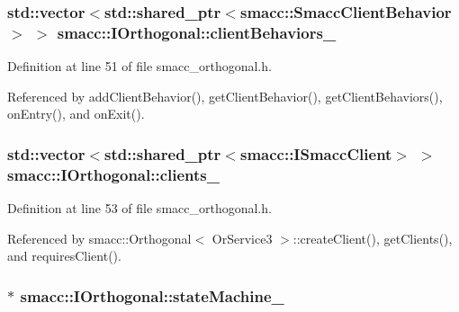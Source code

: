 \subsubsection[{\texorpdfstring{client\+Behaviors\+\_\+}{clientBehaviors_}}]{\setlength{\rightskip}{0pt plus 5cm}std\+::vector$<$std\+::shared\+\_\+ptr$<${\bf smacc\+::\+Smacc\+Client\+Behavior}$>$ $>$ smacc\+::\+I\+Orthogonal\+::client\+Behaviors\+\_\+\hspace{0.3cm}{\ttfamily [protected]}}\hypertarget{classsmacc_1_1IOrthogonal_a8e3a85158f85978f8cc01cca7b1d4091}{}\label{classsmacc_1_1IOrthogonal_a8e3a85158f85978f8cc01cca7b1d4091}


Definition at line 51 of file smacc\+\_\+orthogonal.\+h.



Referenced by add\+Client\+Behavior(), get\+Client\+Behavior(), get\+Client\+Behaviors(), on\+Entry(), and on\+Exit().

\subsubsection[{\texorpdfstring{clients\+\_\+}{clients_}}]{\setlength{\rightskip}{0pt plus 5cm}std\+::vector$<$std\+::shared\+\_\+ptr$<${\bf smacc\+::\+I\+Smacc\+Client}$>$ $>$ smacc\+::\+I\+Orthogonal\+::clients\+\_\+\hspace{0.3cm}{\ttfamily [protected]}}\hypertarget{classsmacc_1_1IOrthogonal_ad3e5fb55db8c40ff178b22c92c9c9cd3}{}\label{classsmacc_1_1IOrthogonal_ad3e5fb55db8c40ff178b22c92c9c9cd3}


Definition at line 53 of file smacc\+\_\+orthogonal.\+h.



Referenced by smacc\+::\+Orthogonal$<$ Or\+Service3 $>$\+::create\+Client(), get\+Clients(), and requires\+Client().

\subsubsection[{\texorpdfstring{state\+Machine\+\_\+}{stateMachine_}}]{$\ast$ smacc\+::\+I\+Orthogonal\+::state\+Machine\+\_\+\hspace{0.3cm}{\ttfamily [protected]}}\hypertarget{classsmacc_1_1IOrthogonal_a6c62a3a971d827d0b2c0b273a49a2129}{}\label{classsmacc_1_1IOrthogonal_a6c62a3a971d827d0b2c0b273a49a2129}


